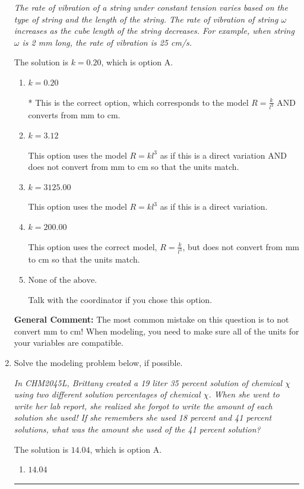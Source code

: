 \documentclass{extbook}[14pt]
\newcommand{\litem}[1]{\item #1

\rule{\textwidth}{0.4pt}}
\begin{document}
\begin{enumerate}
{\begin{center}
    \textit{ The rate of vibration of a string under constant tension varies based on the type of string and the length of the string. The rate of vibration of string $\omega$ increases as the cube length of the string decreases. For example, when string $\omega$ is 2 mm long, the rate of vibration is 25 cm/s. }
\end{center}


The solution is \( k = 0.20 \), which is option A.\begin{enumerate}[label=\Alph*.]
\item \( k = 0.20 \)

* This is the correct option, which corresponds to the model $R = \frac{k}{l^{3}}$ AND converts from mm to cm.
\item \( k = 3.12 \)

This option uses the model $R = kl^{3}$ as if this is a direct variation AND does not convert from mm to cm so that the units match.
\item \( k = 3125.00 \)

This option uses the model $R = kl^{3}$ as if this is a direct variation.
\item \( k = 200.00 \)

This option uses the correct model, $R = \frac{k}{l^{3}}$, but does not convert from mm to cm so that the units match.
\item \( \text{None of the above.} \)

Talk with the coordinator if you chose this option.
\end{enumerate}

\textbf{General Comment:} The most common mistake on this question is to not convert mm to cm! When modeling, you need to make sure all of the units for your variables are compatible.
}
\litem{
Solve the modeling problem below, if possible.

\begin{center}
    \textit{ In CHM2045L, Brittany created a 19 liter 35 percent solution of chemical $\chi$ using two different solution percentages of chemical $\chi$. When she went to write her lab report, she realized she forgot to write the amount of each solution she used! If she remembers she used 18 percent and 41 percent solutions, what was the amount she used of the 41 percent solution? }
\end{center}


The solution is \( 14.04 \), which is option A.\begin{enumerate}[label=\Alph*.]
\item \( 14.04 \)


\end{enumerate}}
\end{enumerate}
\end{document}
